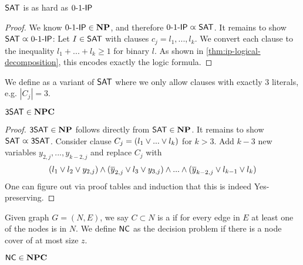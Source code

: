 \begin{theorem} \label{thm:IP-NPC}
    $\mathsf{SAT}$ is as hard as $\text{0-1-}\mathsf{IP}$
\end{theorem}
\begin{proof}
    We know $\text{0-1-}\mathsf{IP} \in \mathbf{NP}$, and therefore $\text{0-1-}\mathsf{IP} \varpropto \mathsf{SAT}$.
    It remains to show $\mathsf{SAT} \varpropto \text{0-1-}\mathsf{IP}$:
    Let $I \in \mathsf{SAT}$ with clauses $c_j={l_1,...,l_k}$. We convert each clause
    to the inequality $l_1+...+l_k\geq 1$ for binary $l$. As shown in \autoref{thm:ip-logical-decomposition}, this encodes exactly the
    logic formula.
\end{proof}
\begin{definition}[$\TSAT$]
    We define  as a variant of $\mathsf{SAT}$ where we only allow clauses with exactly 3 literals, e.g. $|C_j|=3$.

\end{definition}
\begin{theorem}
    $\mathsf{3SAT} \in \mathbf{NPC}$
\end{theorem}
\begin{proof}
    $\mathsf{3SAT} \in \mathbf{NP}$ follows directly from $\mathsf{SAT} \in \mathbf{NP}$. It remains to show $\mathsf{SAT} \varpropto \mathsf{3SAT}$.
    Consider clause $C_j = (l_1 \vee ... \vee l_k)$ for $k > 3$. Add $k-3$ new variables
    $y_{2,j},...,y_{k-2,j}$ and replace $C_j$ with
    \begin{align*}
        (l_1 \vee l_2 \vee y_{2,j}) \wedge (\overline{y}_{2,j} \vee l_3 \vee y_{3,j}) \wedge ... \wedge (\overline{y}_{k-2,j} \vee l_{k-1} \vee l_k)
    \end{align*}
    One can figure out via proof tables and induction that this is indeed Yes-preserving.
\end{proof}
\begin{definition}
    Given graph $G = (N,E)$, we say $C \subset N$ is a 
    if for every edge in $E$ at least one of the nodes is in $N$.
    We define $\mathsf{NC}$ as the decision problem if there is a node cover of at most size $z$.
\end{definition}
\begin{theorem}
    $\mathsf{NC} \in \mathbf{NPC}$
\end{theorem}
